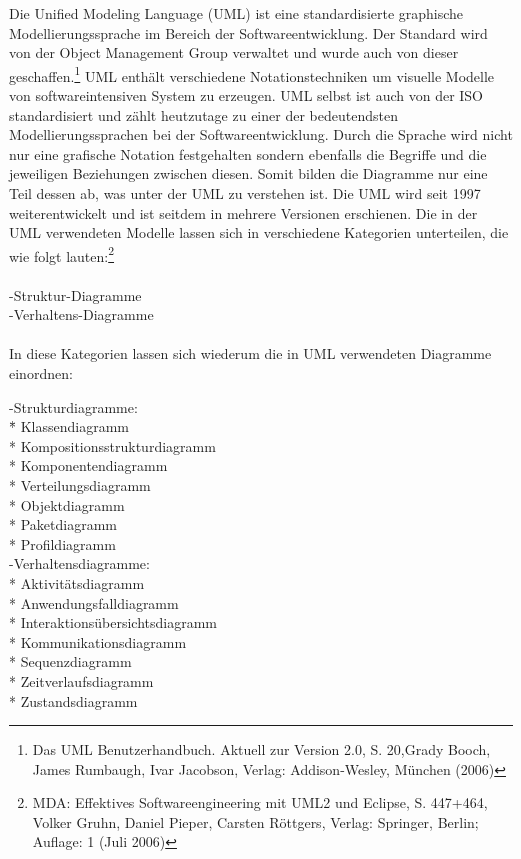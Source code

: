 Die Unified Modeling Language (UML) ist eine standardisierte graphische Modellierungssprache im Bereich der Softwareentwicklung.
Der Standard wird von der Object Management Group verwaltet und wurde auch von dieser geschaffen.\footnote{Das UML Benutzerhandbuch. Aktuell zur Version 2.0, S. 20,Grady Booch, James Rumbaugh, Ivar Jacobson, Verlag: Addison-Wesley, München (2006)}
UML enthält verschiedene Notationstechniken um visuelle Modelle von softwareintensiven System zu erzeugen.
UML selbst ist auch von der ISO standardisiert und zählt heutzutage zu einer der bedeutendsten Modellierungssprachen bei der Softwareentwicklung. Durch die Sprache wird nicht nur eine grafische Notation festgehalten sondern ebenfalls die Begriffe und die jeweiligen Beziehungen zwischen diesen.
Somit bilden die Diagramme nur eine Teil dessen ab, was unter der UML zu verstehen ist.
Die UML wird seit 1997 weiterentwickelt und ist seitdem in mehrere Versionen erschienen.
Die in der UML verwendeten Modelle lassen sich in verschiedene Kategorien unterteilen, die wie folgt lauten:\footnote{MDA: Effektives Softwareengineering mit UML2 und Eclipse, S. 447+464, Volker Gruhn, Daniel Pieper, Carsten Röttgers, Verlag: Springer, Berlin; Auflage: 1 (Juli 2006)}\\
\\
-Struktur-Diagramme\\
-Verhaltens-Diagramme\\
\\
In diese Kategorien lassen sich wiederum die in UML verwendeten Diagramme einordnen:\\
\begin{tabbing}
-Strukturdiagramme:\\
\hspace{10mm} \=* Klassendiagramm\\
\> * Kompositionsstrukturdiagramm\\
\> * Komponentendiagramm\\
\> * Verteilungsdiagramm\\
\> * Objektdiagramm\\
\> * Paketdiagramm\\
\> * Profildiagramm\\
-Verhaltensdiagramme:\\
\> * Aktivitätsdiagramm\\
\> * Anwendungsfalldiagramm\\
\> * Interaktionsübersichtsdiagramm\\
\> * Kommunikationsdiagramm\\
\> * Sequenzdiagramm\\
\> * Zeitverlaufsdiagramm\\
\> * Zustandsdiagramm\\
\end{tabbing}    

